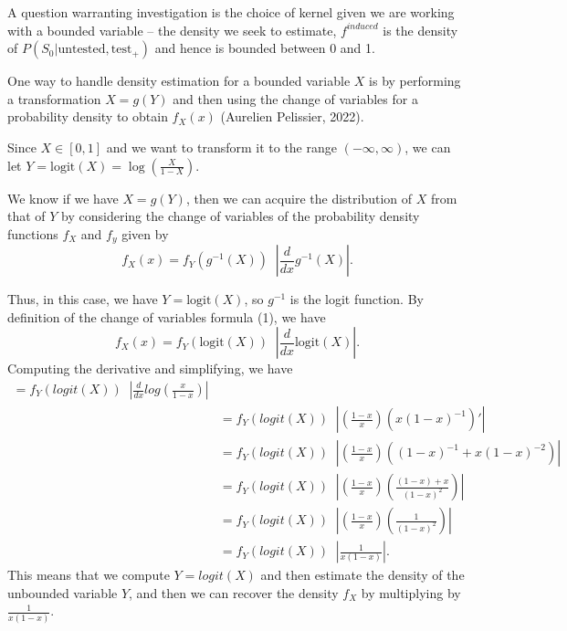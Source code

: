 \documentclass[12pt,twoside]{smiththesis}
\begin{document}
A question warranting investigation is the choice of kernel given we are working with a bounded variable -- the density we seek to estimate, \(f^{induced}\) is the density of \(P(S_0|\text{untested}, \text{test}_+)\) and hence is bounded between 0 and 1.

One way to handle density estimation for a bounded variable \(X\) is by performing a transformation
\(X=g(Y)\) and then using the change of variables for a probability density to obtain \(f_X(x)\) (Aurelien Pelissier, 2022).

Since \(X \in [0,1]\) and we want to transform it to the range \((-\infty,\infty)\), we can let \(Y = \text{logit}(X) = \log \left( \frac{X}{1-X} \right)\).

We know if we have \(X = g(Y)\), then we can acquire the distribution of \(X\) from that of \(Y\) by considering the change of variables of the probability density functions \(f_X\) and \(f_y\) given by
\[f_X(x) = f_Y(g^{-1}(X)) \;\; \left| \frac{d}{dx} g^{-1}(X) \right|. \tag{1}\]

Thus, in this case, we have \(Y = \text{logit}(X)\), so \(g^{-1}\) is the logit function. By definition of the change of variables formula (1), we have
\[f_X(x) = f_Y(\text{logit}(X)) \;\; \left| \frac{d}{dx} \text{logit}(X) \right|.\]
Computing the derivative and simplifying, we have
\begin{align*} = f_Y(logit(X)) \;\; \left| \frac{d}{dx}log(\frac{x}{1-x}) \right|\\
&= f_Y(logit(X)) \;\; \left| \left(\frac{1-x}{x} \right) (x(1-x)^{-1})' \right|\\ 
&= f_Y(logit(X)) \;\; \left| \left(\frac{1-x}{x} \right) ((1-x)^{-1} + x(1-x)^{-2} ) \right|\\
&= f_Y(logit(X)) \;\; \left| \left(\frac{1-x}{x} \right) \left(\frac{(1-x) + x }{ (1-x)^{2} }\right) \right|\\
&= f_Y(logit(X)) \;\; \left| \left(\frac{1-x}{x} \right) \left(\frac{1 }{ (1-x)^{2} }\right) \right|\\
&= f_Y(logit(X)) \;\; \left|  \frac{1 }{ x (1-x) } \right|.
\end{align*}
This means that we compute \(Y = logit(X)\) and then estimate the density of the unbounded variable \(Y\), and then we can recover the density \(f_X\) by multiplying by \(\frac{1 }{ x (1-x) }\).
\end{document}
